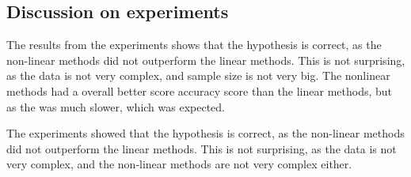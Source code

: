 \subsection{Discussion on experiments}\label{sec:exp-discussion}
The results from the experiments shows that the hypothesis is correct, as the non-linear methods did not outperform the linear methods. This is not surprising, as the data is not very complex, and sample size is not very big. The nonlinear methods had a overall better score accuracy score than the linear methods, but as the was much slower, which was expected.  


The experiments showed that the hypothesis is correct, as the non-linear methods did not outperform the linear methods. This is not surprising, as the data is not very complex, and the non-linear methods are not very complex either. 






